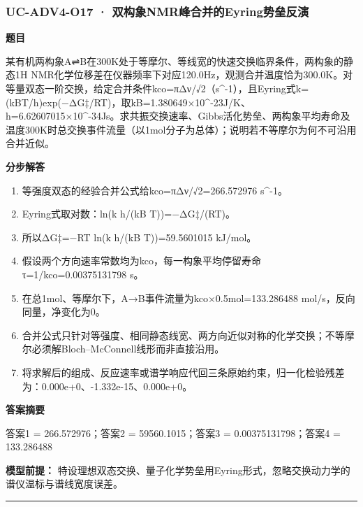 \documentclass[UTF8,11pt,a4paper]{ctexart}
\begin{document}
\subsubsection*{UC-ADV4-O17 · 双构象NMR峰合并的Eyring势垒反演}
\noindent\textbf{题目}\par
某有机两构象A⇌B在300K处于等摩尔、等线宽的快速交换临界条件，两构象的静态1H NMR化学位移差在仪器频率下对应120.0Hz，观测合并温度恰为300.0K。对等量双态一阶交换，给定合并条件kco=πΔν/√2（s\textasciicircum{}-1），且Eyring式k=(kBT/h)exp(−ΔG‡/RT)，取kB=1.380649×10\textasciicircum{}-23J/K、h=6.62607015×10\textasciicircum{}-34Js。求共振交换速率、Gibbs活化势垒、两构象平均寿命及温度300K时总交换事件流量（以1mol分子为总体）；说明若不等摩尔为何不可沿用合并近似。\par
\medskip\noindent\textbf{分步解答}
\begin{enumerate}
\item 等强度双态的经验合并公式给kco=πΔν/√2=266.572976 s\textasciicircum{}-1。
\item Eyring式取对数：ln(k h/(kB T))=−ΔG‡/(RT)。
\item 所以ΔG‡=−RT ln(k h/(kB T))=59.5601015 kJ/mol。
\item 假设两个方向速率常数均为kco，每一构象平均停留寿命τ=1/kco=0.00375131798 s。
\item 在总1mol、等摩尔下，A→B事件流量为kco×0.5mol=133.286488 mol/s，反向同量，净变化为0。
\item 合并公式只针对等强度、相同静态线宽、两方向近似对称的化学交换；不等摩尔必须解Bloch–McConnell线形而非直接沿用。
\item 将求解后的组成、反应速率或谱学响应代回三条原始约束，归一化检验残差为：0.000e+0、-1.332e-15、0.000e+0。
\end{enumerate}
\noindent\textbf{答案摘要}\par
答案1 = 266.572976；答案2 = 59560.1015；答案3 = 0.00375131798；答案4 = 133.286488\par
\noindent\textbf{模型前提：}
特设理想双态交换、量子化学势垒用Eyring形式，忽略交换动力学的谱仪温标与谱线宽度误差。\par
\medskip\hrule\medskip
{}
\end{document}
